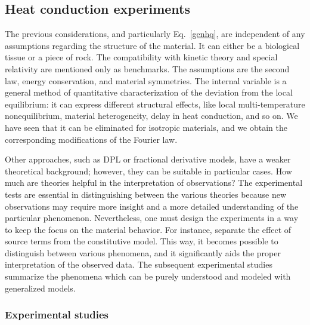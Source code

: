 \documentclass[sn-mathphys]{sn-jnl}%
\theoremstyle{thmstyleone}%
\theoremstyle{thmstyletwo}%
\theoremstyle{thmstylethree}%
\begin{document}
{%
{\color{black}\subsection{ Heat conduction experiments}
	
The previous considerations, and particularly Eq.~\eqref{genhq}, are independent of any assumptions regarding the structure of the material. It can either be a biological tissue or a piece of rock. The compatibility with kinetic theory and special relativity are mentioned only as benchmarks. The assumptions are the second law, energy conservation, and material symmetries. The internal variable is a general method of quantitative characterization of the deviation from the local equilibrium: it can express different structural effects, like local multi-temperature nonequilibrium, material heterogeneity, delay in heat conduction, and so on. We have seen that it can be eliminated for isotropic materials, and we obtain the corresponding modifications of the Fourier law.

Other approaches, such as DPL or fractional derivative models, have a weaker theoretical background; however, they can be suitable in particular cases. How much are theories helpful in the interpretation of observations? The experimental tests are essential in distinguishing between the various theories because new observations may require more insight and a more detailed understanding of the particular phenomenon. Nevertheless, one must design the experiments in a way to keep the focus on the material behavior. For instance, separate the effect of source terms from the constitutive model. This way, it becomes possible to distinguish between various phenomena, and it significantly aids the proper interpretation of the observed data. The subsequent experimental studies summarize the phenomena which can be purely understood and modeled with generalized models.}



\subsubsection{Experimental studies}

}
\end{document}
